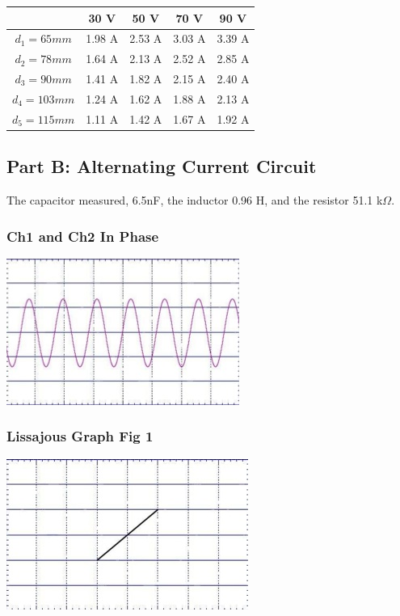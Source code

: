 \documentclass[titlepage]{article}
\begin{document}
\begin{tabular}{ccccc}
\hline
 & 30 V & 50 V & 70 V & 90 V\\
\hline
$d_1 = 65mm$ & 1.98 A & 2.53 A & 3.03 A & 3.39 A\\
\hline
$d_2 = 78mm$ & 1.64 A & 2.13 A & 2.52 A & 2.85 A\\
\hline
$d_3 = 90mm$ & 1.41 A & 1.82 A & 2.15 A & 2.40 A\\
\hline
$d_4 = 103mm$ & 1.24 A & 1.62 A & 1.88 A & 2.13 A\\
\hline
$d_5 = 115mm$ & 1.11 A & 1.42 A & 1.67 A & 1.92 A\\
\hline
\end{tabular}

\subsection{Part B: Alternating Current Circuit}\label{sub:part_b_alternating_current_circuit-data}
The capacitor measured, 6.5nF, the inductor 0.96 H, and the resistor 51.1 k$\Omega$.

\subsubsection{Ch1 and Ch2 In Phase}\label{ssub:ch1_and_ch2_in_phase}
\includegraphics{1.jpg}

\subsubsection{Lissajous Graph Fig 1}\label{ssub:lissajous_graph}
\includegraphics{2.jpg}
\end{document}
